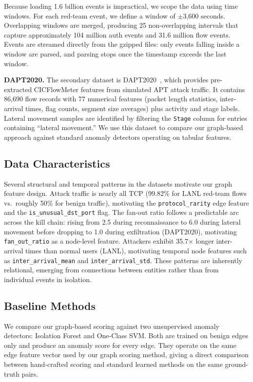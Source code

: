Because loading 1.6 billion events is impractical, we scope the data using time windows. For each red-team event, we define a window of $\pm$3,600 seconds. Overlapping windows are merged, producing 25 non-overlapping intervals that capture approximately 104 million auth events and 31.6 million flow events. Events are streamed directly from the gzipped files: only events falling inside a window are parsed, and parsing stops once the timestamp exceeds the last window.

\textbf{DAPT2020.}
The secondary dataset is DAPT2020~\cite{dapt2020}, which provides pre-extracted CICFlowMeter features from simulated APT attack traffic. It contains 86,690 flow records with 77 numerical features (packet length statistics, inter-arrival times, flag counts, segment size averages) plus activity and stage labels. Lateral movement samples are identified by filtering the \texttt{Stage} column for entries containing ``lateral movement.'' We use this dataset to compare our graph-based approach against standard anomaly detectors operating on tabular features.

\subsection{Data Characteristics}

Several structural and temporal patterns in the datasets motivate our graph feature design. Attack traffic is nearly all TCP (99.82\% for LANL red-team flows vs.\ roughly 50\% for benign traffic), motivating the \texttt{protocol\_rarity} edge feature and the \texttt{is\_unusual\_dst\_port} flag. The fan-out ratio follows a predictable arc across the kill chain: rising from 2.5 during reconnaissance to 6.0 during lateral movement before dropping to 1.0 during exfiltration (DAPT2020), motivating \texttt{fan\_out\_ratio} as a node-level feature. Attackers exhibit 35.7$\times$ longer inter-arrival times than normal users (LANL), motivating temporal node features such as \texttt{inter\_arrival\_mean} and \texttt{inter\_arrival\_std}. These patterns are inherently relational, emerging from connections between entities rather than from individual events in isolation.

\subsection{Baseline Methods}

We compare our graph-based scoring against two unsupervised anomaly detectors: Isolation Forest and One-Class SVM. Both are trained on benign edges only and produce an anomaly score for every edge. They operate on the same edge feature vector used by our graph scoring method, giving a direct comparison between hand-crafted scoring and standard learned methods on the same ground-truth pairs.

